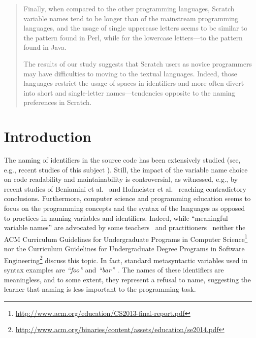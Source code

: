 \documentclass[conference]{IEEEtran}
\newcommand{\todo}[1]{ \textbf{#1} }
\newcommand{\quotes}[1]{\textit{``#1''}}
\begin{document}
\begin{abstract}
Finally, when compared to the other programming languages, Scratch variable names tend to be longer than of the mainstream programming languages, and the usage of single uppercase letters seems to be similar to the pattern found in Perl, while for the lowercase letters---to the pattern found in Java. 

The results of our study suggests that Scratch users as novice programmers may have difficulties to moving to the textual languages. 
Indeed, those languages restrict the usage of spaces in identifiers and more often divert into short and single-letter names---tendencies opposite to the naming preferences in Scratch.%
\end{abstract}

\IEEEpeerreviewmaketitle

\section{Introduction}
The naming of identifiers in the source code has been extensively studied (see, e.g., recent studies of this subject \cite{AmanASK15,AvidanF17,Beniamini,ButlerWYS10,HofmeisterSH17,LunguK13,ScannielloR13,TramontanaRS14}).
Still, the impact of the variable name choice on code readability and maintainability is controversial, as witnessed, e.g., by recent studies of Beniamini et al.~\cite{Beniamini} and Hofmeister et al.~\cite{HofmeisterSH17} reaching contradictory conclusions.
%
Furthermore, computer science and programming education seems to focus on the programming concepts and the syntax of the languages as opposed to practices in naming variables and identifiers. 
Indeed, while ``meaningful variable names'' are advocated by some teachers~\cite{Kato2016, hermans_aivaloglou} and practitioners~\cite{Rother} neither the ACM Curriculum Guidelines for Undergraduate Programs in Computer Science\footnote{\url{http://www.acm.org/education/CS2013-final-report.pdf}} nor the Curriculum Guidelines for Undergraduate Degree Programs in Software Engineering\footnote{\url{http://www.acm.org/binaries/content/assets/education/se2014.pdf}} discuss this topic.
In fact, standard metasyntactic variables used in syntax examples are \quotes{foo} and \quotes{bar}~\cite{Raymond}.
The names of these identifiers are meaningless, and to some extent, they represent a refusal to name, suggesting the learner that naming is less important %
to the programming task. 
\end{document}
